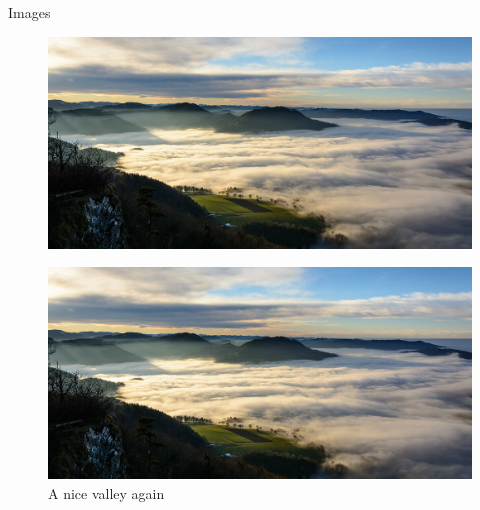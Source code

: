 \documentclass[10pt,compress]{beamer}
\begin{document}
\begin{frame}{Images}

\begin{figure}[htbp]
\centering
\includegraphics{images/valley.jpg}
\end{figure}

\end{frame}

\begin{frame}

\begin{figure}[htbp]
\centering
\includegraphics{images/valley.jpg}
\caption{A nice valley again}
\end{figure}

\end{frame}
\end{document}
